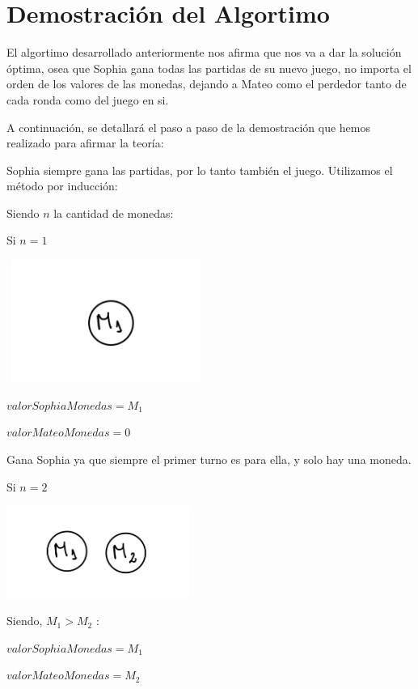 \section{Demostración del Algortimo}

El algortimo desarrollado anteriormente nos afirma que nos va a dar la solución óptima,
osea que Sophia gana todas las partidas de su nuevo juego, no importa el orden de los valores
de las monedas, dejando a Mateo como el perdedor tanto de cada ronda como del juego en si.

\vskip0.5cm

A continuación, se detallará el paso a paso de la demostración que hemos realizado para afirmar la teoría:

\vskip0.5cm

{\large{Sophia siempre gana las partidas, por lo tanto también el juego}}.
\vskip0.5cm
Utilizamos el método por inducción:
\vskip0.5cm

Siendo $n$ la cantidad de monedas:
\vskip0.5cm

Si $n=1$ 

\includegraphics[width=6.5cm, height=4cm]{images/IMG_1625.jpg}


$valorSophiaMonedas=M_{1}$

$valorMateoMonedas=0$

Gana Sophia ya que siempre el primer turno es para ella, y solo hay una moneda.

\vskip1cm

Si $n=2$

\includegraphics[width=6cm, height=3cm]{images/IMG_1626.jpg}

Siendo, $M_{1}>M_{2}$ : 


$valorSophiaMonedas=M_{1}$

$valorMateoMonedas=M_{2}$


